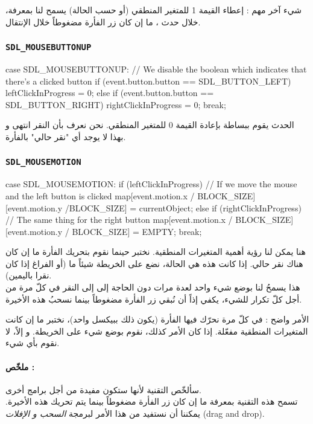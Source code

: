 شيء آخر مهم : إعطاء القيمة 1 للمتغير المنطقي
(أو
حسب الحالة) يسمح لنا بمعرفة، خلال حدث
،
ما إن كان زر الفأرة مضغوطاً خلال الإنتقال.

\subsubsection{\texttt{SDL\_MOUSEBUTTONUP}}

\begin{Csource}
case SDL_MOUSEBUTTONUP: // We disable the boolean which indicates that there's a clicked button
if (event.button.button == SDL_BUTTON_LEFT)
	leftClickInProgress = 0;
else if (event.button.button == SDL_BUTTON_RIGHT)
	rightClickInProgress = 0;
break;
\end{Csource}

الحدث
يقوم ببساطة بإعادة القيمة 0 للمتغير المنطقي. نحن نعرف بأن النقر انتهى و بهذا لا يوجد أي "نقر حالي" بالفأرة.

\subsubsection{\texttt{SDL\_MOUSEMOTION}}

\begin{Csource}
case SDL_MOUSEMOTION:
if (leftClickInProgress) // If we move the mouse and the left button is clicked
{
	map[event.motion.x / BLOCK_SIZE][event.motion.y /BLOCK_SIZE] = currentObject;
}
else if (rightClickInProgress) // The same thing for the right button
{
	map[event.motion.x / BLOCK_SIZE][event.motion.y / BLOCK_SIZE] = EMPTY;
}
break;
\end{Csource}

هنا يمكن لنا رؤية أهمية المتغيرات المنطقية. نختبر حينما نقوم بتحريك الفأرة ما إن كان هناك نقر حالي. إذا كانت هذه هي الحالة، نضع على الخريطة شيئاً ما (أو الفراغ إذا كان نقرا باليمين).\\
هذا يسمحُ لنا بوضع شيء واحد لعدة مرات دون الحاجة إلى إلى النقر في كلّ مرة من أجل كلّ تكرار للشيء، يكفي إذاً أن نُبقي زر الفأرة مضغوطاً بينما نسحبُ هذه الأخيرة.

الأمر واضح : في كلّ مرة نحرّك فيها الفأرة (يكون ذلك ببيكسل واحد)، نختبر ما إن كانت المتغيرات المنطقية مفعّلة. إذا كان الأمر كذلك، نقوم بوضع شيء على الخريطة. و إلاً، لا نقوم بأي شيء.

\paragraph{ملخّص :}
سألخّص التقنية لأنها ستكون مفيدة من أجل برامج أخرى.\\
تسمح هذه التقنية بمعرفة ما إن كان زر الفأرة مضغوطاً بينما يتم تحريك هذه الأخيرة. يمكننا أن نستفيد من هذا الأمر لبرمجة
\textit{السحب و الإفلات}
(\textenglish{drag and drop}).

